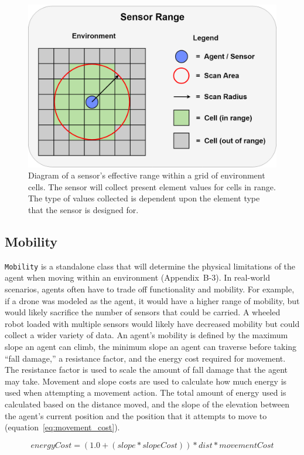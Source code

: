 \begin{figure}[!htb]
  \centering
  \includegraphics[width=0.70\columnwidth]{Figures/sensor_range.png}
  \caption[Sensor Scan Range Diagram]{Diagram of a sensor's effective range within a grid of environment cells. The sensor will collect present element values for cells in range. The type of values collected is dependent upon the element type that the sensor is designed for.}
  \label{fig:sensor_range}
\end{figure}


\subsection{Mobility} \label{subsec:mobility}
\texttt{Mobility} is a standalone class  that will determine the physical limitations of the agent when moving within an environment (Appendix~B-3).
In real-world scenarios, agents often have to trade off functionality and mobility.
For example, if a drone was modeled as the agent, it would have a higher range of mobility, but would likely sacrifice the number of sensors that could be carried.
A wheeled robot loaded with multiple sensors would likely have decreased mobility but could collect a wider variety of data.
An agent's mobility is defined by the maximum slope an agent can climb, the minimum slope an agent can traverse before taking ``fall damage,'' a resistance factor, and the energy cost required for movement.
The resistance factor is used to scale the amount of fall damage that the agent may take.
Movement and slope costs are used to calculate how much energy is used when attempting a movement action.
The total amount of energy used is calculated based on the distance moved, and the slope of the elevation between the agent's current position and the position that it attempts to move to (equation~\ref{eq:movement_cost}).

\begin{capeq}[H]
  \begin{equation} \label{eq:movement_cost}
    energyCost = (1.0 + (slope * slopeCost)) * dist * movementCost
  \end{equation}
  \caption[Movement Energy Cost]{Equation to calculate the energy required for an agent to move within an environment. This is based on the agent's $movementCost$ and $slopeCost$, and the physical $slope$ and $distance$ that is traveled.}
\end{capeq}


